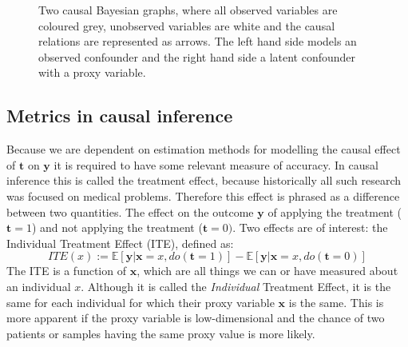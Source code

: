 \documentclass{report}
\newcommand{\E}{\mathbb{E}}
\newcommand{\bt}{\mathbf{t}}
\newcommand{\bX}{\mathbf{X}}
\newcommand{\bx}{\mathbf{x}}
\newcommand{\by}{\mathbf{y}}
\newcommand{\bZ}{\mathbf{Z}}
\newcommand{\cneeded}{\footnote{Citation needed}}
\begin{document}
\begin{figure}
    \centering
    
    \hspace{2cm}
    
    \caption{Two causal Bayesian graphs, where all observed variables are coloured grey, unobserved variables are white and the causal relations are represented as arrows. The left hand side models an observed confounder and the right hand side a latent confounder with a proxy variable.}
    \label{fig:graph_observed_confounder_and_latent_with_proxy}
\end{figure}





\subsection{Metrics in causal inference}
\label{section:metrics}
Because we are dependent on estimation methods for modelling the causal effect of $\bt$ on $\by$ it is required to have some relevant measure of accuracy. In causal inference this is called the treatment effect, because historically all such research was focused on medical problems. Therefore this effect is phrased as a difference between two quantities. The effect on the outcome $\by$ of applying the treatment ($\bt=1$) and not applying the treatment ($\bt=0)$. Two effects are of interest: the Individual Treatment Effect (ITE), defined as:
\begin{equation}\label{equation:ITE}
    ITE(x) := \E[\by | \bx=x, do(\bt=1)] - \E[\by | \bx=x, do(\bt=0)]
\end{equation}
The ITE is a function of $\bx$, which are all things we can or have measured about an individual $x$. Although it is called the \textit{Individual} Treatment Effect, it is the same for each individual for which their proxy variable $\bx$ is the same. This is more apparent if the proxy variable is low-dimensional and the chance of two patients or samples having the same proxy value is more likely.
\end{document}
